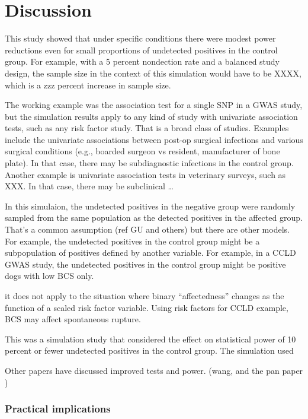 \documentclass[
]{article}
\begin{document}
\hypertarget{discussion}{%
\section{Discussion}\label{discussion}}

This study showed that under specific conditions there were modest power
reductions even for small proportions of undetected positives in the
control group. For example, with a 5 percent nondection rate and a
balanced study design, the sample size in the context of this simulation
would have to be XXXX, which is a zzz percent increase in sample size.

The working example was the association test for a single SNP in a GWAS
study, but the simulation results apply to any kind of study with
univariate association tests, such as any risk factor study. That is a
broad class of studies. Examples include the univariate associations
between post-op surgical infections and various surgical conditions
(e.g., boarded surgeon vs resident, manufacturer of bone plate). In that
case, there may be subdiagnostic infections in the control group.
Another example is univariate association tests in veterinary surveys,
such as XXX. In that case, there may be subclinical \ldots{}

In this simulaion, the undetected positives in the negative group were
randomly sampled from the same population as the detected positives in
the affected group. That's a common assumption (ref GU and others) but
there are other models. For example, the undetected positives in the
control group might be a subpopulation of positives defined by another
variable. For example, in a CCLD GWAS study, the undetected positives in
the control group might be positive dogs with low BCS only.

it does not apply to the situation where binary ``affectedness'' changes
as the function of a scaled risk factor variable. Using risk factors for
CCLD example, BCS may affect spontaneous rupture.

This was a simulation study that considered the effect on statistical
power of 10 percent or fewer undetected positives in the control group.
The simulation used

Other papers have discussed improved tests and power. (wang, and the pan
paper )

\hypertarget{practical-implications}{%
\subsubsection{Practical implications}\label{practical-implications}}
\end{document}
